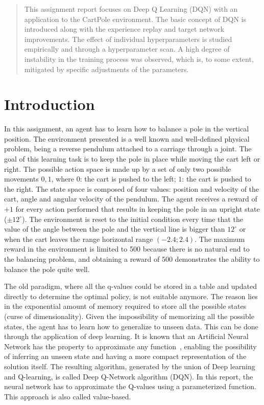 \documentclass{article}
\begin{document}
\begin{abstract}
This assignment report focuses on Deep Q Learning (DQN)
with an application to the CartPole environment. 
The basic concept of DQN is introduced along with the experience replay 
and target network improvements.
The effect of individual hyperparameters is studied empirically 
and through a hyperparameter scan.
A high degree of instability in the training process was observed, 
which is, to some extent, mitigated by specific adjustments of the parameters.
\end{abstract}

\section{Introduction}
\label{sec:introduction}
In this assignment, an agent has to learn how to balance a pole in the vertical position.
The environment presented is a well known and well-defined physical problem, being a reverse pendulum attached to a carriage through a joint.
The goal of this learning task is to keep the pole in place while moving the cart left or right.
The possible action space is made up by a set of only two possible movements ${0,1}$, where $0$: the cart is pushed to the left; $1$: the cart is pushed to the right.
The state space is composed of four values: position and velocity of the cart, angle and angular velocity of the pendulum.
The agent receives a reward of $+1$ for every action performed that results in keeping the pole in an upright state ($\pm 12^\circ$).
The environment is reset to the initial condition every time that the value of the angle between the pole and the vertical line is bigger than $12^\circ$ or when the cart leaves the range horizontal range $(-2.4;2.4)$.
The maximum reward in the environment is limited to 500 because there is no natural end to the balancing problem, and obtaining a reward of 500 demonstrates the ability to balance the pole quite well.

The old paradigm, where all the q-values could be stored in a table and updated directly to determine the optimal policy, is not suitable anymore.
The reason lies in the exponential amount of memory required to store all the possible states (curse of dimensionality).
Given the impossibility of memorizing all the possible states, the agent has to learn how to generalize to unseen data.
This can be done through the application of deep learning.
It is known that an Artificial Neural Network has the property to approximate any function~\cite{Cybenko}, enabling the possibility of inferring an unseen state and having a more compact representation of the solution itself.
The resulting algorithm, generated by the union of Deep learning and Q-learning, is called Deep Q-Network algorithm (DQN).
In this report, the neural network has to approximate the Q-values using a parameterized function.
This approach is also called value-based.
\end{document}
